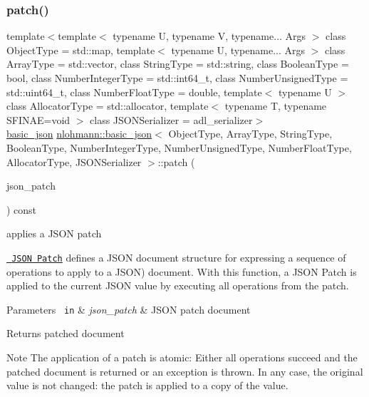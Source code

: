 \subsubsection{\texorpdfstring{patch()}{patch()}}
{\footnotesize\ttfamily template$<$template$<$ typename U, typename V, typename... Args $>$ class Object\+Type = std\+::map, template$<$ typename U, typename... Args $>$ class Array\+Type = std\+::vector, class String\+Type  = std\+::string, class Boolean\+Type  = bool, class Number\+Integer\+Type  = std\+::int64\+\_\+t, class Number\+Unsigned\+Type  = std\+::uint64\+\_\+t, class Number\+Float\+Type  = double, template$<$ typename U $>$ class Allocator\+Type = std\+::allocator, template$<$ typename T, typename S\+F\+I\+N\+A\+E=void $>$ class J\+S\+O\+N\+Serializer = adl\+\_\+serializer$>$ \\
\mbox{\hyperlink{classnlohmann_1_1basic__json}{basic\+\_\+json}} \mbox{\hyperlink{classnlohmann_1_1basic__json}{nlohmann\+::basic\+\_\+json}}$<$ Object\+Type, Array\+Type, String\+Type, Boolean\+Type, Number\+Integer\+Type, Number\+Unsigned\+Type, Number\+Float\+Type, Allocator\+Type, J\+S\+O\+N\+Serializer $>$\+::patch (\begin{DoxyParamCaption}\item[{const \mbox{\hyperlink{classnlohmann_1_1basic__json}{basic\+\_\+json}}$<$ Object\+Type, Array\+Type, String\+Type, Boolean\+Type, Number\+Integer\+Type, Number\+Unsigned\+Type, Number\+Float\+Type, Allocator\+Type, J\+S\+O\+N\+Serializer $>$ \&}]{json\+\_\+patch }\end{DoxyParamCaption}) const\hspace{0.3cm}{\ttfamily [inline]}}



applies a J\+S\+ON patch 

\href{http://jsonpatch.com}{\texttt{ J\+S\+ON Patch}} defines a J\+S\+ON document structure for expressing a sequence of operations to apply to a J\+S\+ON) document. With this function, a J\+S\+ON Patch is applied to the current J\+S\+ON value by executing all operations from the patch.


\begin{DoxyParams}[1]{Parameters}
\mbox{\texttt{ in}}  & {\em json\+\_\+patch} & J\+S\+ON patch document \\
\hline
\end{DoxyParams}
\begin{DoxyReturn}{Returns}
patched document
\end{DoxyReturn}
\begin{DoxyNote}{Note}
The application of a patch is atomic\+: Either all operations succeed and the patched document is returned or an exception is thrown. In any case, the original value is not changed\+: the patch is applied to a copy of the value.
\end{DoxyNote}

